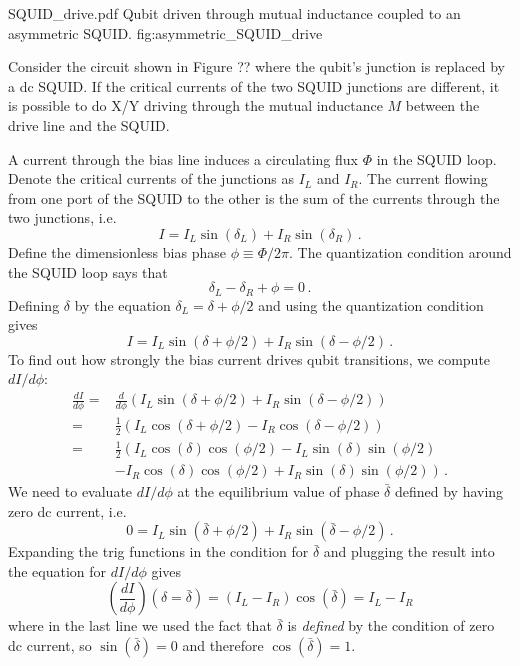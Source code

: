
\quickfig{\columnwidth}
{SQUID_drive.pdf}
{Qubit driven through mutual inductance coupled to an asymmetric SQUID.}
{fig:asymmetric_SQUID_drive}

Consider the circuit shown in Figure ?? where the qubit's junction is replaced by a dc SQUID.
If the critical currents of the two SQUID junctions are different, it is possible to do X/Y driving through the mutual inductance $M$ between the drive line and the SQUID.

A current through the bias line induces a circulating flux $\Phi$ in the SQUID loop.
Denote the critical currents of the junctions as $I_L$ and $I_R$.
The current flowing from one port of the SQUID to the other is the sum of the currents through the two junctions, i.e.
\begin{equation}
  I = I_L \sin(\delta_L) + I_R \sin(\delta_R) \, .
\end{equation}
Define the dimensionless bias phase $\phi \equiv \Phi / 2\pi$.
The quantization condition around the SQUID loop says that
\begin{equation}
  \delta_L - \delta_R + \phi = 0 \, .
\end{equation}
Defining $\delta$ by the equation $\delta_L = \delta + \phi/2$ and using the quantization condition gives
\begin{equation}
  I = I_L \sin(\delta + \phi/2) + I_R \sin(\delta - \phi/2) \, .
\end{equation}
To find out how strongly the bias current drives qubit transitions, we compute $dI/d\phi$:
\begin{align*}
  \frac{dI}{d\phi}
  =& \frac{d}{d\phi} \left( I_L \sin(\delta + \phi/2) + I_R \sin(\delta - \phi/2) \right) \\
  =& \frac{1}{2} \left( I_L \cos(\delta + \phi/2) - I_R \cos(\delta - \phi/2) \right) \\
  =& \frac{1}{2}
  \left(
              I_L \cos(\delta) \cos(\phi/2) - I_L \sin(\delta)\sin(\phi/2) \right. \\
    & \left. -I_R \cos(\delta) \cos(\phi/2) + I_R \sin(\delta)\sin(\phi/2)
  \right) \, .
\end{align*}
We need to evaluate $dI/d\phi$ at the equilibrium value of phase $\bar{\delta}$ defined by having zero dc current, i.e.
\begin{equation*}
  0 = I_L \sin(\bar{\delta} + \phi/2) + I_R \sin(\bar{\delta} - \phi/2) \, .
\end{equation*}
Expanding the trig functions in the condition for $\bar{\delta}$ and plugging the result into the equation for $dI/d\phi$ gives
\begin{equation}
  \left( \frac{dI}{d\phi} \right)(\delta=\bar{\delta})
  = (I_L - I_R) \cos(\bar{\delta})
  = I_L - I_R
\end{equation}
where in the last line we used the fact that $\bar{\delta}$ is \emph{defined} by the condition of zero dc current, so $\sin(\bar{\delta}) = 0$ and therefore $\cos(\bar{\delta})=1$.

